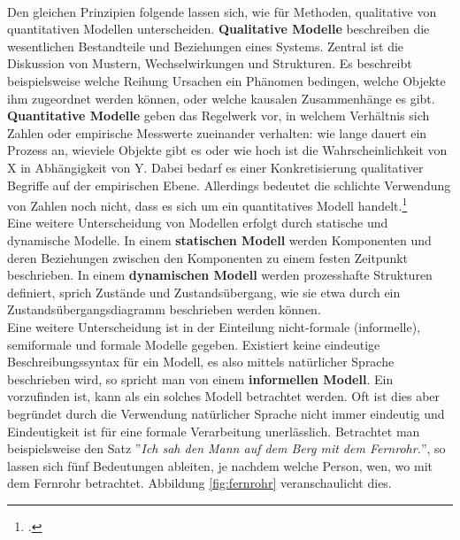 \documentclass[12pt,a4paper]{article}
\begin{document}
\\
Den gleichen Prinzipien folgende lassen sich, wie für Methoden, qualitative von quantitativen Modellen unterscheiden. \textbf{Qualitative Modelle} beschreiben die wesentlichen Bestandteile und Beziehungen eines Systems. Zentral ist die Diskussion von Mustern, Wechselwirkungen und Strukturen. Es beschreibt beispielsweise welche Reihung Ursachen ein Phänomen bedingen, welche Objekte ihm zugeordnet werden können, oder welche kausalen Zusammenhänge es gibt. \textbf{Quantitative Modelle} geben das Regelwerk vor, in welchem Verhältnis sich Zahlen oder empirische Messwerte zueinander verhalten: wie lange dauert ein Prozess an, wieviele Objekte gibt es oder wie hoch ist die Wahrscheinlichkeit von X in Abhängigkeit von Y. Dabei bedarf es einer Konkretisierung qualitativer Begriffe auf der empirischen Ebene. Allerdings bedeutet die schlichte Verwendung von Zahlen noch nicht, dass es sich um ein quantitatives Modell handelt.\footcite[][S.309–329]{wolf1995qualitative}
\\ 
Eine weitere Unterscheidung von Modellen erfolgt durch statische und dynamische Modelle. In einem \textbf{statischen Modell} werden Komponenten und deren Beziehungen zwischen den Komponenten zu einem festen Zeitpunkt beschrieben. In einem \textbf{dynamischen Modell} werden prozesshafte Strukturen definiert, sprich Zustände und Zustandsübergang, wie sie etwa durch ein Zustandsübergangsdiagramm beschrieben werden können.
\\
Eine weitere Unterscheidung ist in der Einteilung nicht-formale (informelle), semiformale und formale Modelle gegeben. Existiert keine eindeutige Beschreibungssyntax für ein Modell, es also mittels natürlicher Sprache beschrieben wird, so spricht man von einem \textbf{informellen Modell}. Ein vorzufinden ist, kann als ein solches Modell betrachtet werden. Oft ist dies aber begründet durch die Verwendung natürlicher Sprache nicht immer eindeutig und Eindeutigkeit ist für eine formale Verarbeitung unerlässlich. Betrachtet man beispielsweise den Satz ''\textit{Ich sah den Mann auf dem Berg mit dem Fernrohr.}'', so lassen sich fünf Bedeutungen ableiten, je nachdem welche Person, wen, wo mit dem Fernrohr betrachtet. Abbildung \ref{fig:fernrohr} veranschaulicht dies.
\end{document}
